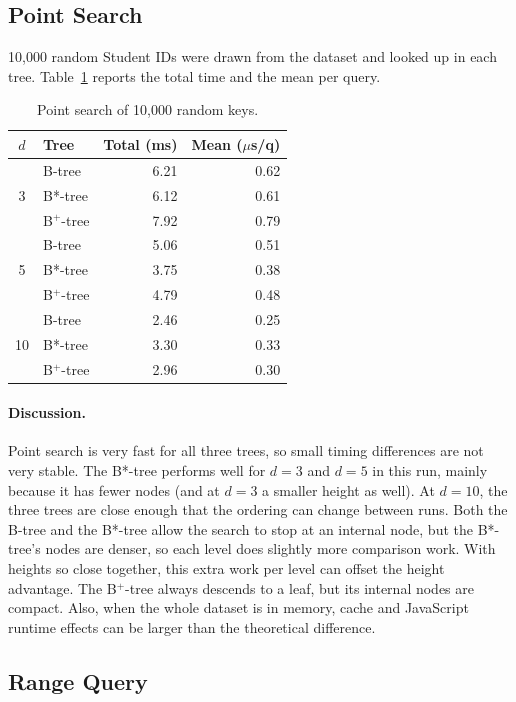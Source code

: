 \documentclass[sigconf]{acmart}
\begin{document}
\subsection{Point Search}

10{,}000 random Student IDs were drawn from the dataset and looked up
in each tree. Table~\ref{tab:search} reports the total time and the
mean per query.

\begin{table}[h]
\centering
\small
\caption{Point search of 10{,}000 random keys.}
\label{tab:search}
\begin{tabular}{cl rr}
\toprule
$d$ & Tree & Total (ms) & Mean ($\mu$s/q)\\
\midrule
\multirow{3}{*}{3}
 & B-tree   & 6.21 & 0.62 \\
 & B*-tree  & 6.12 & 0.61 \\
 & B$^+$-tree & 7.92 & 0.79 \\
\midrule
\multirow{3}{*}{5}
 & B-tree   & 5.06 & 0.51 \\
 & B*-tree  & 3.75 & 0.38 \\
 & B$^+$-tree & 4.79 & 0.48 \\
\midrule
\multirow{3}{*}{10}
 & B-tree   & 2.46 & 0.25 \\
 & B*-tree  & 3.30 & 0.33 \\
 & B$^+$-tree & 2.96 & 0.30 \\
\bottomrule
\end{tabular}
\end{table}

\paragraph{Discussion.} Point search is very fast for all three
trees, so small timing differences are not very stable. The B*-tree
performs well for $d=3$ and $d=5$ in this run, mainly because it has
fewer nodes (and at $d=3$ a smaller height as well). At $d=10$, the
three trees are close enough that the ordering can change between
runs. Both the B-tree and the B*-tree allow the search to stop at an
internal node, but the B*-tree's nodes are denser, so each level does
slightly more comparison work. With heights so close together, this
extra work per level can offset the height advantage. The B$^+$-tree
always descends to a leaf, but its internal nodes are compact. Also,
when the whole dataset is in memory, cache and JavaScript runtime
effects can be larger than the theoretical difference.

\subsection{Range Query}
\end{document}
